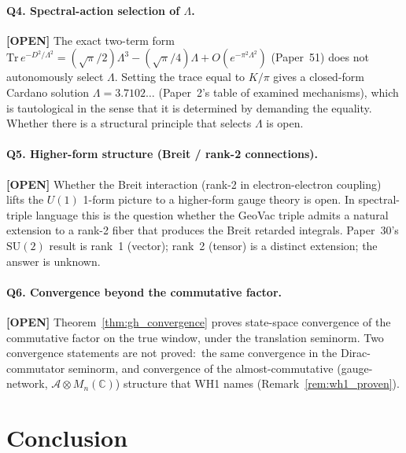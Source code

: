 \documentclass[11pt]{article}
\begin{document}
\paragraph{Q4.  Spectral-action selection of $\Lambda$.}  \textbf{[OPEN]}  The
exact two-term form
$\mathrm{Tr}\,e^{-D^2/\Lambda^2} = (\sqrt{\pi}/2)\Lambda^3 -
(\sqrt{\pi}/4)\Lambda + O(e^{-\pi^2\Lambda^2})$ (Paper~51) does not
autonomously select $\Lambda$.  Setting the trace equal to $K/\pi$
gives a closed-form Cardano solution $\Lambda = 3.7102\ldots$
(Paper~2's table of examined mechanisms), which is tautological in the
sense that it is determined by demanding the equality.  Whether there is a structural principle
that selects $\Lambda$ is open.

\paragraph{Q5.  Higher-form structure (Breit / rank-2 connections).}
\textbf{[OPEN]}
Whether the Breit interaction (rank-2 in
electron-electron coupling) lifts the $U(1)$ 1-form picture to a
higher-form gauge theory is open.  In spectral-triple language this is the
question whether the GeoVac triple admits a natural extension to a
rank-2 fiber that produces the Breit retarded integrals.  Paper~30's
$\mathrm{SU}(2)$ result is rank~1 (vector); rank~2 (tensor) is a
distinct extension; the answer is unknown.

\paragraph{Q6.  Convergence beyond the commutative factor.}
\textbf{[OPEN]}  Theorem~\ref{thm:gh_convergence} proves state-space
convergence of the commutative factor on the true window, under the
translation seminorm.  Two convergence statements are not proved:\ the
same convergence in the Dirac-commutator seminorm, and convergence of
the almost-commutative (gauge-network, $\mathcal{A} \otimes
M_n(\mathbb{C})$) structure that WH1 names
(Remark~\ref{rem:wh1_proven}).

\section{Conclusion}
\label{sec:conclusion}
\end{document}

